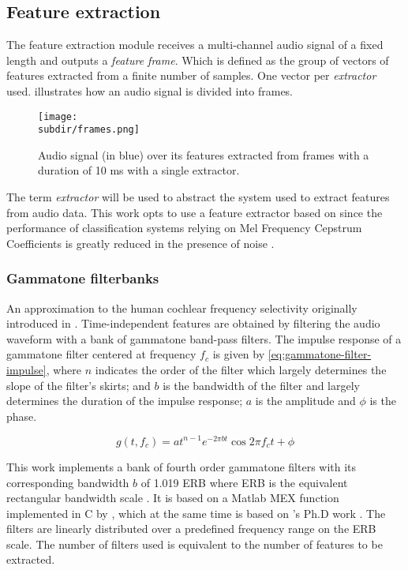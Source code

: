 \subsection{Feature extraction} \label{subsec:feature-extraction}

The feature extraction module receives a multi-channel audio signal of a fixed
length and outputs a \emph{feature frame}. Which is defined as the group of
vectors of features extracted from a finite number of samples. One vector per
\emph{extractor} used.  illustrates how an audio
signal is divided into frames.

\begin{figure}
    \centering
    \texttt{[image: \\subdir/frames.png]}
    \caption[Audio frames]{Audio signal (in {\color{blue} blue}) over its
        features extracted from frames with a duration of 10 ms with a single
         extractor.}
    \label{fig:datasets-frames}
\end{figure}

The term \emph{extractor} will be used to abstract the system used to extract
features from audio data. This work opts to use a feature extractor based on
 since the performance of
classification systems relying on Mel Frequency Cepstrum Coefficients is
greatly reduced in the presence of noise \cite{marchegiani2018a}.

\subsubsection*{Gammatone filterbanks} \label{subsubsec:gammatone-filterbank}

An approximation to the human cochlear frequency selectivity originally
introduced in \cite{GTF1998}. Time-independent features are obtained by
filtering the audio waveform with a bank of gammatone band-pass filters. The
impulse response of a gammatone filter centered at frequency $f_c$ is given by
\cref{eq:gammatone-filter-impulse}, where $n$ indicates the order of the filter
which largely determines the slope of the filter's skirts; and $b$ is the
bandwidth of the filter and largely determines the duration of the impulse
response; $a$ is the amplitude and $\phi$ is the phase.

\begin{equation}
    g(t, f_c) = a t^{n-1}e^{-2 \pi b t} \cos{2 \pi f_c t + \phi}
    \label{eq:gammatone-filter-impulse}
\end{equation}

This work implements a bank of fourth order gammatone filters with its
corresponding bandwidth $b$ of 1.019 ERB where ERB is the equivalent
rectangular bandwidth scale \cite{GLASBERG1990103}. It is based on a Matlab MEX
function implemented in C by \citeauthor{CorrelogramMa2007}
\cite{CorrelogramMa2007}, which at the same time is based on
\citeauthor{Cooke1993ModellingAP}'s Ph.D work \cite{Cooke1993ModellingAP}. The
filters are linearly distributed over a predefined frequency range on the ERB
scale. The number of filters used is equivalent to the number of features to be
extracted. 